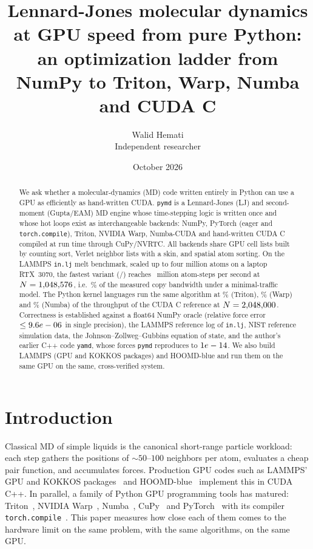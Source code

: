 \documentclass[11pt]{article}
\title{Lennard-Jones molecular dynamics at GPU speed from pure Python:\\
an optimization ladder from NumPy to Triton, Warp, Numba and CUDA C}
\author{Walid Hemati\\ \small Independent researcher}
\date{October 2026}
\newcommand{\pymd}{\texttt{pymd}}
\newcommand{\yamd}{\texttt{yamd}}
\begin{document}
\maketitle

\ifnum{}
\begin{center}
\end{center}
\fi

\begin{abstract}
We ask whether a molecular-dynamics (MD) code written entirely in Python can use a GPU as
efficiently as hand-written CUDA. \pymd{} is a Lennard-Jones (LJ) and second-moment
(Gupta/EAM) MD engine whose time-stepping logic is written once and whose hot loops exist as
interchangeable backends: NumPy, PyTorch (eager and \texttt{torch.compile}), Triton, NVIDIA
Warp, Numba-CUDA and hand-written CUDA C compiled at run time through CuPy/NVRTC. All
backends share GPU cell lists built by counting sort, Verlet neighbor lists with a skin, and
spatial atom sorting. On the LAMMPS \texttt{in.lj} melt benchmark, scaled up to four million
atoms on a laptop RTX~3070, the fastest variant (\bestBackend/\bestVariant) reaches
\bestRate{}~million atom-steps per second at $N=1{,}048{,}576$, i.e.\ \bestPctCopy\% of the measured
copy bandwidth under a minimal-traffic model. The Python kernel languages run the same
algorithm at \ratioTriton\% (Triton), \ratioWarp\% (Warp) and \ratioNumba\% (Numba) of the
throughput of the CUDA C reference at $N=2{,}048{,}000$. Correctness is established against a float64
NumPy oracle (relative force error $\le9.6e-06$ in single precision), the
LAMMPS reference log of \texttt{in.lj}, NIST reference simulation data, the
Johnson--Zollweg--Gubbins equation of state, and the author's earlier C++ code \yamd{},
whose forces \pymd{} reproduces to $1e-14$. We also build LAMMPS (GPU and KOKKOS
packages) and HOOMD-blue and run them on the same GPU on the same, cross-verified system.
\end{abstract}

\section{Introduction}
Classical MD of simple liquids is the canonical short-range particle workload: each step
gathers the positions of ${\sim}50$--$100$ neighbors per atom, evaluates a cheap pair
function, and accumulates forces. Production GPU codes such as LAMMPS' GPU and KOKKOS
packages~\cite{brown2011lammpsgpu,thompson2022lammps} and HOOMD-blue~\cite{anderson2008hoomd,
glaser2015,anderson2020hoomd} implement this in CUDA C++. In parallel, a family of Python GPU
programming tools has matured: Triton~\cite{tillet2019triton}, NVIDIA
Warp~\cite{warp2022}, Numba~\cite{lam2015numba}, CuPy~\cite{okuta2017cupy} and
PyTorch~\cite{paszke2019pytorch} with its compiler \texttt{torch.compile}~\cite{ansel2024pytorch2}.
This paper measures how close each of them comes to the hardware limit on the same problem,
with the same algorithms, on the same GPU.
\end{document}
